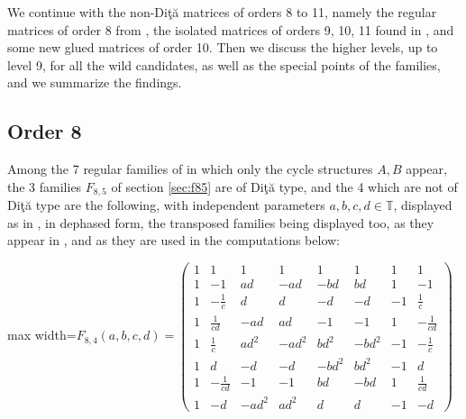 \documentclass[11pt]{amsart}
\newcommand{\T}{\mathbb T}
\begin{document}
We continue with the non-Di\c t\u a matrices of orders 8 to 11, namely the regular matrices of order 8 from \cite{gt}, the isolated matrices of orders 9, 10, 11 found in \cite{ben}, and some new glued matrices of order 10. Then we discuss the higher levels, up to level 9, for all the wild candidates, as well as the special points of the families, and we summarize the findings.

\subsection{Order 8}

Among the 7 regular families of \cite{gt} in which only the cycle structures $A,B$ appear, the 3 families $F_{8,5}$ of section \ref{sec:f85} are of Di\c t\u a type, and the 4 which are not of Di\c t\u a type are the following, with independent parameters $a,b,c,d\in\T$, displayed as in \cite{gt}, in dephased form, the transposed families being displayed too, as they appear in \cite{gt}, and as they are used in the computations below:

\begin{center}\normalsize\setlength{\arraycolsep}{3.8pt}
\begin{adjustbox}{max width=\textwidth}$\displaystyle F_{8,4}(a,b,c,d)=\begin{pmatrix}
1 & 1 & 1 & 1 & 1 & 1 & 1 & 1 \\
1 & -1 & ad & -ad & -bd & bd & 1 & -1 \\
1 & -\frac{1}{c} & d & d & -d & -d & -1 & \frac{1}{c} \\
1 & \frac{1}{cd} & -ad & ad & -1 & -1 & 1 & -\frac{1}{cd} \\
1 & \frac{1}{c} & ad^{2} & -ad^{2} & bd^{2} & -bd^{2} & -1 & -\frac{1}{c} \\
1 & d & -d & -d & -bd^{2} & bd^{2} & -1 & d \\
1 & -\frac{1}{cd} & -1 & -1 & bd & -bd & 1 & \frac{1}{cd} \\
1 & -d & -ad^{2} & ad^{2} & d & d & -1 & -d
\end{pmatrix}$\end{adjustbox}
\end{center}
\end{document}
